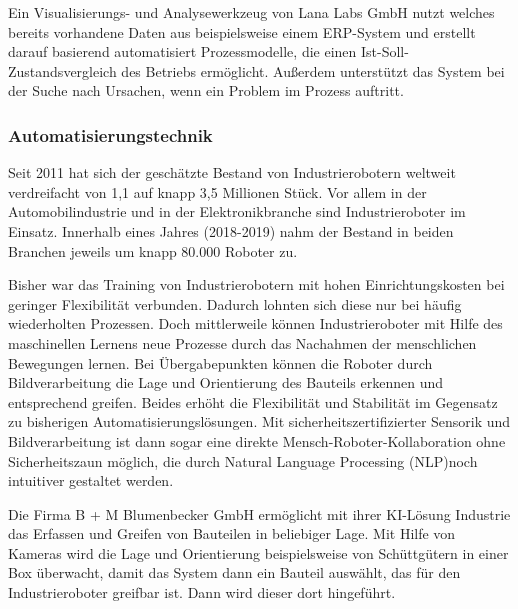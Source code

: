 \documentclass[a4paper,12pt, german]{report}
\begin{document}
Ein Visualisierungs- und Analysewerkzeug von Lana Labs GmbH nutzt welches bereits vorhandene Daten aus beispielsweise einem ERP-System und erstellt darauf basierend automatisiert Prozessmodelle, die einen  Ist-Soll-Zustandsvergleich des Betriebs ermöglicht. Außerdem unterstützt das System bei der Suche nach Ursachen, wenn ein Problem im Prozess auftritt. \cite{24}

\subsubsection{Automatisierungstechnik}
Seit 2011 hat sich der geschätzte Bestand von Industrierobotern weltweit verdreifacht von 1,1 auf knapp 3,5 Millionen Stück.\cite{25} Vor allem in der Automobilindustrie und in der Elektronikbranche sind Industrieroboter im Einsatz. Innerhalb eines Jahres (2018-2019) nahm der Bestand in beiden Branchen jeweils um knapp 80.000 Roboter zu.\cite{26}

Bisher war das Training von Industrierobotern mit hohen Einrichtungskosten bei geringer Flexibilität verbunden. Dadurch lohnten sich diese nur bei häufig wiederholten Prozessen. Doch mittlerweile können Industrieroboter mit Hilfe des maschinellen Lernens neue Prozesse durch das Nachahmen der menschlichen Bewegungen lernen. Bei Übergabepunkten können die Roboter durch Bildverarbeitung die Lage und Orientierung des Bauteils erkennen und entsprechend greifen. Beides erhöht die Flexibilität und Stabilität im Gegensatz zu bisherigen Automatisierungslösungen.
Mit sicherheitszertifizierter Sensorik und Bildverarbeitung ist dann sogar eine  direkte Mensch-Roboter-Kollaboration ohne Sicherheitszaun möglich, die durch Natural Language Processing (NLP)noch intuitiver gestaltet werden.

Die Firma B + M Blumenbecker GmbH ermöglicht mit ihrer KI-Lösung Industrie das Erfassen und Greifen von Bauteilen in beliebiger Lage. Mit Hilfe von Kameras wird die Lage und Orientierung beispielsweise von Schüttgütern in einer Box überwacht, damit das System dann ein Bauteil auswählt, das für den Industrieroboter greifbar ist. Dann wird dieser dort hingeführt. \cite{24}
\end{document}

